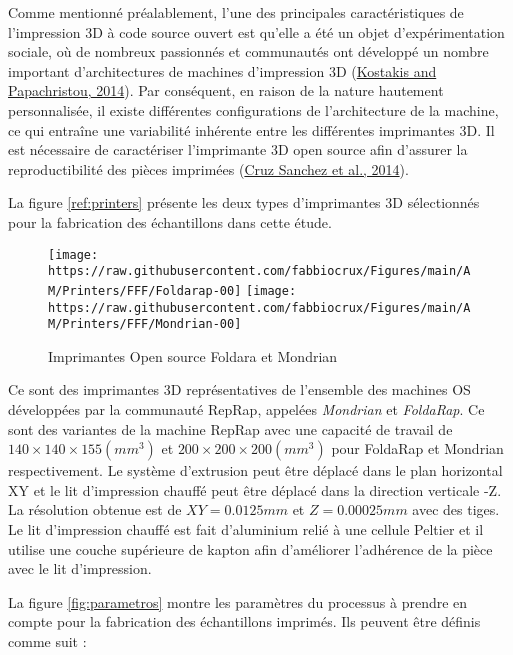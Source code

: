 \documentclass[
]{article}
\begin{document}
Comme mentionné préalablement, l'une des principales caractéristiques de l'impression 3D à code source ouvert est qu'elle a été un objet d'expérimentation sociale, où de nombreux passionnés et communautés ont développé un nombre important d'architectures de machines d'impression 3D (\protect\hyperlink{ref-Kostakis2013}{Kostakis and Papachristou, 2014}).
Par conséquent, en raison de la nature hautement personnalisée, il existe différentes configurations de l'architecture de la machine, ce qui entraîne une variabilité inhérente entre les différentes imprimantes 3D.
Il est nécessaire de caractériser l'imprimante 3D open source afin d'assurer la reproductibilité des pièces imprimées (\protect\hyperlink{ref-CruzSanchez2014}{Cruz Sanchez et al., 2014}).

La figure \ref{ref:printers} présente les deux types d'imprimantes 3D sélectionnés pour la fabrication des échantillons dans cette étude.

\begin{figure}

{\centering \texttt{[image: https://raw.githubusercontent.com/fabbiocrux/Figures/main/AM/Printers/FFF/Foldarap-00]} \texttt{[image: https://raw.githubusercontent.com/fabbiocrux/Figures/main/AM/Printers/FFF/Mondrian-00]} 

}

\caption{Imprimantes Open source Foldara et Mondrian}\label{fig:printers}
\end{figure}

Ce sont des imprimantes 3D représentatives de l'ensemble des machines OS développées par la communauté RepRap, appelées \emph{Mondrian} et \emph{FoldaRap}.
Ce sont des variantes de la machine RepRap avec une capacité de travail de \(140×140×155(mm^{3})\) et \(200×200×200(mm^{3})\) pour FoldaRap et Mondrian respectivement. Le système d'extrusion peut être déplacé dans le plan horizontal XY et le lit d'impression chauffé peut être déplacé dans la direction verticale -Z. La résolution obtenue est de \(XY = 0.0125mm\) et \(Z = 0.00025mm\) avec des tiges.
Le lit d'impression chauffé est fait d'aluminium relié à une cellule Peltier et il utilise une couche supérieure de kapton afin d'améliorer l'adhérence de la pièce avec le lit d'impression.

La figure \ref{fig:parametros} montre les paramètres du processus à prendre en compte pour la fabrication des échantillons imprimés. Ils peuvent être définis comme suit :
\end{document}
